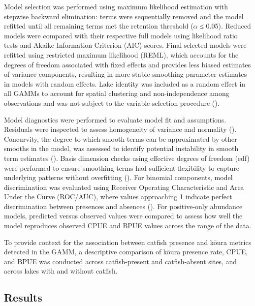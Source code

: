 \documentclass[
  letterpaper,
  DIV=11,
  numbers=noendperiod]{scrartcl}
\begin{document}
Model selection was performed using maximum likelihood estimation with
stepwise backward elimination: terms were sequentially removed and the
model refitted until all remaining terms met the retention threshold
(\(\alpha\) ≤ 0.05). Reduced models were compared with their respective
full models using likelihood ratio tests and Akaike Information
Criterion (AIC) scores. Final selected models were refitted using
restricted maximum likelihood (REML), which accounts for the degrees of
freedom associated with fixed effects and provides less biased estimates
of variance components, resulting in more stable smoothing parameter
estimates in models with random effects. Lake identity was included as a
random effect in all GAMMs to account for spatial clustering and
non-independence among observations and was not subject to the variable
selection procedure ().

Model diagnostics were performed to evaluate model fit and assumptions.
Residuals were inspected to assess homogeneity of variance and normality
(). Concurvity, the degree to
which smooth terms can be approximated by other smooths in the model,
was assessed to identify potential instability in smooth term estimates
(). Basis dimension checks using
effective degrees of freedom (edf) were performed to ensure smoothing
terms had sufficient flexibility to capture underlying patterns without
overfitting (). For binomial
components, model discrimination was evaluated using Receiver Operating
Characteristic and Area Under the Curve (ROC/AUC), where values
approaching 1 indicate perfect discrimination between presences and
absences (). For
positive-only abundance models, predicted versus observed values were
compared to assess how well the model reproduces observed CPUE and BPUE
values across the range of the data.

To provide context for the association between catfish presence and
kōura metrics detected in the GAMM, a descriptive comparison of kōura
presence rate, CPUE, and BPUE was conducted across catfish-present and
catfish-absent sites, and across lakes with and without catfish.

\subsection{Results}\label{results}
\end{document}
